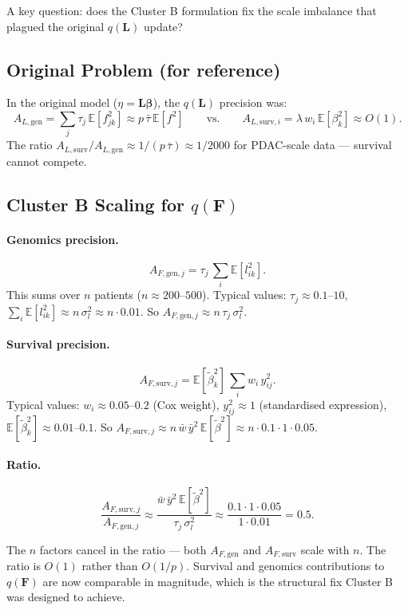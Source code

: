 \documentclass[11pt]{article}
\newcommand{\E}{\mathbb{E}}
\begin{document}
A key question: does the Cluster B formulation fix the scale imbalance that plagued the
original $q(\mathbf{L})$ update?

\subsection{Original Problem (for reference)}

In the original model ($\eta = \mathbf{L}\boldsymbol{\beta}$), the $q(\mathbf{L})$ precision was:
\[
  A_{L,\text{gen}} = \sum_j \tau_j\,\E[f_{jk}^2] \approx p\,\bar\tau\,\E[f^2]
  \qquad \text{vs.} \qquad
  A_{L,\text{surv},i} = \lambda\,w_i\,\E[\beta_k^2] \approx O(1).
\]
The ratio $A_{L,\text{surv}}/A_{L,\text{gen}} \approx 1/(p\,\bar\tau) \approx 1/2000$
for PDAC-scale data — survival cannot compete.

\subsection{Cluster B Scaling for $q(\mathbf{F})$}

\paragraph{Genomics precision.}
\[
  A_{F,\text{gen},j} = \tau_j\,\sum_i \E[l_{ik}^2].
\]
This sums over $n$ patients ($n \approx 200$--$500$). Typical values: $\tau_j \approx 0.1$--$10$,
$\sum_i \E[l_{ik}^2] \approx n\,\sigma_l^2 \approx n \cdot 0.01$. So $A_{F,\text{gen},j} \approx n\,\tau_j\,\sigma_l^2$.

\paragraph{Survival precision.}
\[
  A_{F,\text{surv},j} = \E[\tilde\beta_k^2]\,\sum_i w_i\,y_{ij}^2.
\]
Typical values: $w_i \approx 0.05$--$0.2$ (Cox weight), $y_{ij}^2 \approx 1$ (standardised expression),
$\E[\tilde\beta_k^2] \approx 0.01$--$0.1$. So
$A_{F,\text{surv},j} \approx n\,\bar w\,\bar y^2\,\E[\tilde\beta^2] \approx n \cdot 0.1 \cdot 1 \cdot 0.05$.

\paragraph{Ratio.}
\[
  \frac{A_{F,\text{surv},j}}{A_{F,\text{gen},j}}
  \approx \frac{\bar w\,\bar y^2\,\E[\tilde\beta^2]}{\tau_j\,\sigma_l^2}
  \approx \frac{0.1 \cdot 1 \cdot 0.05}{1 \cdot 0.01}
  = 0.5.
\]

\begin{verifybox}
The $n$ factors cancel in the ratio — both $A_{F,\text{gen}}$ and $A_{F,\text{surv}}$ scale with $n$.
The ratio is $O(1)$ rather than $O(1/p)$. Survival and genomics contributions to $q(\mathbf{F})$
are now comparable in magnitude, which is the structural fix Cluster B was designed to achieve.
\end{verifybox}
\end{document}
